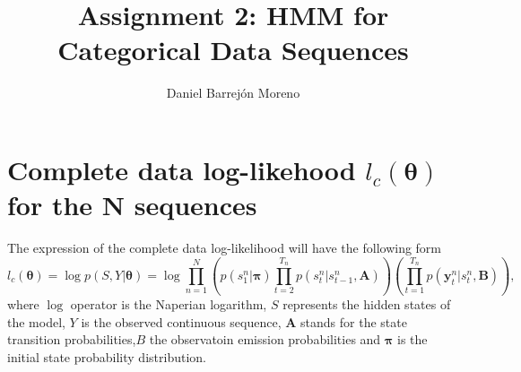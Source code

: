 \documentclass[12pt]{article}
\begin{document}
	


\title{Assignment 2: HMM for Categorical Data Sequences}%
\author{Daniel Barrejón Moreno} %

\maketitle
\section{Complete data log-likehood $l_{c}\left(\boldsymbol\theta\right)$ for the N sequences}
The expression of the complete data log-likelihood will have the following form
\begin{equation}
\label{ll1}
l_{c}\left(\boldsymbol\theta\right) = \log p ( S , Y | \boldsymbol\theta ) = \log \prod _ { n = 1 } ^ { N } \left( p \left( s _ { 1 } ^ { n } | \boldsymbol\pi \right) \prod _ { t = 2 } ^ { T _ { n } } p \left( s _ { t } ^ { n } | s _ { t - 1 } ^ { n } , \mathbf { A } \right) \right) \left( \prod _ { t = 1 } ^ { T _ { n } } p \left( \mathbf { y } _ { t } ^ { n } | s _ { t } ^ { n } , \mathbf { B } \right) \right),
\end{equation}
where $\log$ operator is the Naperian logarithm, $S$ represents the hidden states of the model, $Y$ is the observed continuous sequence, $\mathbf { A }$ stands for the state transition probabilities,$B$ the observatoin emission probabilities and $\boldsymbol\pi$ is the initial state probability distribution.\\
\end{document}
